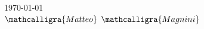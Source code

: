 \documentclass{resume} %
\begin{document}
    \vspace{2em} %
    \begin{flushright}
        \today
        \\
        \vspace{1em}
        \Large$\mathcalligra{Matteo}$  $\mathcalligra{Magnini}$
        
    \end{flushright}
    
\end{document}
